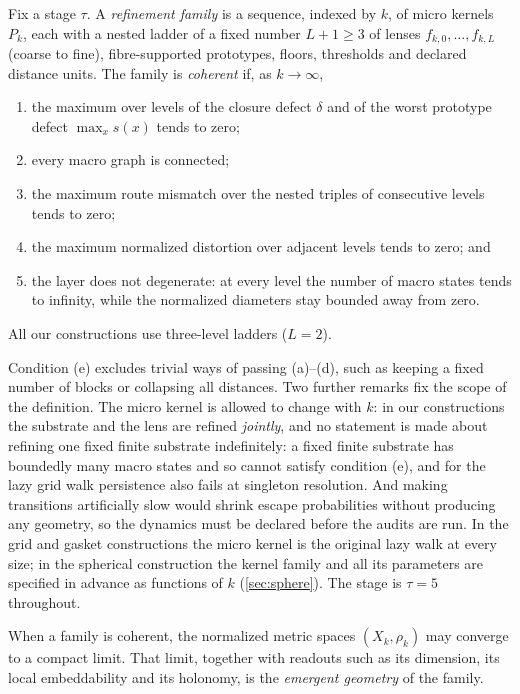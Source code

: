 \documentclass[11pt]{article}
\begin{document}
\begin{definition}
\label{def:coherence}
Fix a stage $\tau$.
A \emph{refinement family} is a sequence, indexed by $k$, of micro kernels $P_k$, each with a nested ladder of a fixed number $L+1\ge3$ of lenses $f_{k,0},\dots,f_{k,L}$ (coarse to fine), fibre-supported prototypes, floors, thresholds and declared distance units.
The family is \emph{coherent} if, as $k\to\infty$,
\begin{enumerate}[label=(\alph*)]
\item the maximum over levels of the closure defect $\delta$ and of the worst prototype defect $\max_x s(x)$ tends to zero;
\item every macro graph is connected;
\item the maximum route mismatch over the nested triples of consecutive levels tends to zero;
\item the maximum normalized distortion over adjacent levels tends to zero; and
\item the layer does not degenerate: at every level the number of macro states tends to infinity, while the normalized diameters stay bounded away from zero.
\end{enumerate}
All our constructions use three-level ladders ($L=2$).
\end{definition}

Condition (e) excludes trivial ways of passing (a)--(d), such as keeping a fixed number of blocks or collapsing all distances.
Two further remarks fix the scope of the definition.
The micro kernel is allowed to change with $k$: in our constructions the substrate and the lens are refined \emph{jointly}, and no statement is made about refining one fixed finite substrate indefinitely: a fixed finite substrate has boundedly many macro states and so cannot satisfy condition (e), and for the lazy grid walk persistence also fails at singleton resolution.
And making transitions artificially slow would shrink escape probabilities without producing any geometry, so the dynamics must be declared before the audits are run.
In the grid and gasket constructions the micro kernel is the original lazy walk at every size; in the spherical construction the kernel family and all its parameters are specified in advance as functions of $k$ (\cref{sec:sphere}).
The stage is $\tau=5$ throughout.

When a family is coherent, the normalized metric spaces $(X_k,\rho_k)$ may converge to a compact limit.
That limit, together with readouts such as its dimension, its local embeddability and its holonomy, is the \emph{emergent geometry} of the family.
\end{document}
